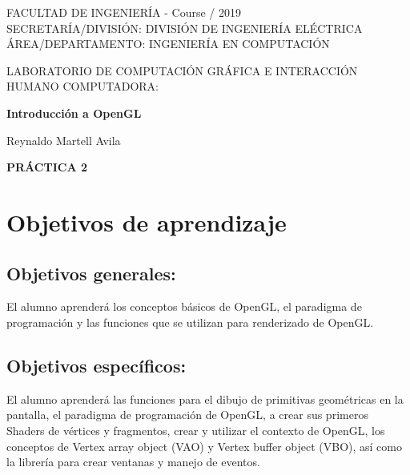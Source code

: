 \documentclass[11pt, english]{article}
\makeatletter
\newcounter{unomenos}
\gdef\@date{ Course \arabic{unomenos}/ 2019}
\makeatother
\begin{document}
\begin{titlepage}
\begin{center}
FACULTAD DE INGENIERÍA - \@date\\
\vspace*{0.15in}
SECRETARÍA/DIVISIÓN: DIVISIÓN DE INGENIERÍA ELÉCTRICA \\
ÁREA/DEPARTAMENTO: INGENIERÍA EN COMPUTACIÓN \\
\vspace*{0.4in}
\begin{large}
LABORATORIO DE COMPUTACIÓN GRÁFICA E INTERACCIÓN HUMANO COMPUTADORA:\\
\end{large}
\vspace*{0.2in}
\begin{Large}
\textbf{Introducción a OpenGL} \\
\end{Large}
\vspace*{0.3in}
\vspace*{0.3in}
\begin{large}
Reynaldo Martell Avila \\
\end{large}
\vspace*{0.5in}
\vspace*{0.5in}
\begin{large}
\textbf{PRÁCTICA 2} \\
\end{large}
\end{center}
\end{titlepage}

\newcommand{\CC}{C\nolinebreak\hspace{-.05em}\raisebox{.4ex}{\tiny\bf +}\nolinebreak\hspace{-.10em}\raisebox{.4ex}{\tiny\bf +}}
\def\CC{{C\nolinebreak[4]\hspace{-.05em}\raisebox{.4ex}{\tiny\bf ++}}}

\tableofcontents

\newpage
\section{Objetivos de aprendizaje}
\subsection{Objetivos generales:}
El alumno aprenderá los conceptos básicos de OpenGL, el paradigma de programación y las funciones que se utilizan para renderizado de OpenGL.
\subsection{Objetivos específicos:}
El alumno aprenderá las funciones para el dibujo de primitivas geométricas en la pantalla, el paradigma de programación de OpenGL, a crear sus primeros Shaders de vértices y fragmentos, crear y utilizar el contexto de OpenGL, los conceptos de Vertex array object (VAO) y Vertex buffer object (VBO), así como la librería para crear ventanas y manejo de eventos.
\end{document}
